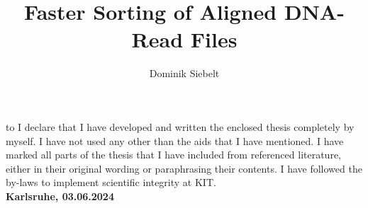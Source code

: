 \documentclass[runningheads]{llncs}
\renewcommand\#{\protect\scalebox{0.8}{\protect\raisebox{0.4ex}{\char"0023}}}
\begin{document}
%
\title{Faster Sorting of Aligned DNA-Read Files}
%
%
\author{Dominik Siebelt}
%
%
%
\maketitle              %
%
\newpage
\thispagestyle{empty}
\phantom{abc}
\newpage

\thispagestyle{empty}
\null\vfill
\noindent\hbox to \textwidth{\hrulefill} 
%
% 
I declare that I have developed and written the enclosed
thesis completely by myself. 
I have not used any other than the aids that I have mentioned. 
I have marked all parts of the thesis that I have included from 
referenced literature, either in their original wording or paraphrasing their
contents. 
I have followed the by-laws to implement scientific integrity at KIT.\\
 
 
\noindent\textbf{Karlsruhe, 03.06.2024}
\vspace{1.5cm}
 
\end{document}
